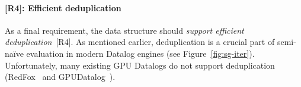 \documentclass[nonacm,sigplan]{acmart}
\begin{document}
\paragraph*{[R4]: Efficient deduplication}
 As a final requirement, the data structure should \emph{support efficient deduplication}~[R4]. As mentioned earlier, deduplication is a crucial part of semi-na\"ive evaluation in modern Datalog engines (see Figure~\ref{fig:sg-iter}). Unfortunately, many existing GPU Datalogs do not support deduplication (RedFox~\cite{wu2014redfox} and GPUDatalog~\cite{martinez2013Datalog}).


    



\end{document}
